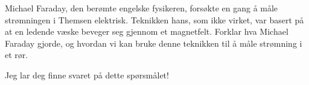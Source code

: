 

Michael Faraday, den berømte engelske fysikeren, forsøkte en gang å måle strømningen i Themsen elektrisk. Teknikken hans, som ikke virket, var basert på at en ledende væske beveger seg gjennom et magnetfelt. Forklar hva Michael Faraday gjorde, og hvordan vi kan bruke denne teknikken til å måle strømning i et rør.







Jeg lar deg finne svaret på dette spørsmålet!










